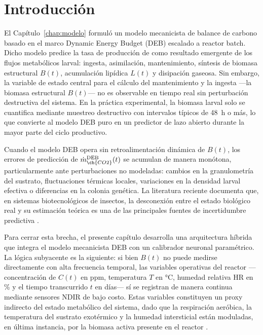 \section{Introducción}
\label{sec:cap4_introduccion}

El Capítulo~\ref{chap:modelo} formuló un modelo mecanicista de balance de carbono basado en el marco Dynamic Energy Budget (DEB) escalado a reactor batch. Dicho modelo predice la tasa de producción de  como resultado emergente de los flujos metabólicos larval: ingesta, asimilación, mantenimiento, síntesis de biomasa estructural $B(t)$, acumulación lipídica $L(t)$ y disipación gaseosa. Sin embargo, la variable de estado central para el cálculo del mantenimiento y la ingesta ---la biomasa estructural $B(t)$--- no es observable en tiempo real sin perturbación destructiva del sistema. En la práctica experimental, la biomasa larval solo se cuantifica mediante muestreo destructivo con intervalos típicos de 48~h o más, lo que convierte al modelo DEB puro en un predictor de lazo abierto durante la mayor parte del ciclo productivo.

Cuando el modelo DEB opera sin retroalimentación dinámica de $B(t)$, los errores de predicción de $\dot{m}_{\ch{CO2}}^{\mathrm{DEB}}(t)$ se acumulan de manera monótona, particularmente ante perturbaciones no modeladas: cambios en la granulometría del sustrato, fluctuaciones térmicas locales, variaciones en la densidad larval efectiva o diferencias en la colonia genética. La literatura reciente documenta que, en sistemas biotecnológicos de insectos, la desconexión entre el estado biológico real y su estimación teórica es una de las principales fuentes de incertidumbre predictiva \autocite{kobelskiProcessOptimizationBlack2024,padmanabhaModellingOptimalControl2023a}.

Para cerrar esta brecha, el presente capítulo desarrolla una arquitectura híbrida que integra el modelo mecanicista DEB con un calibrador neuronal paramétrico. La lógica subyacente es la siguiente: si bien $B(t)$ no puede medirse directamente con alta frecuencia temporal, las variables operativas del reactor ---concentración de  $C(t)$ en ppm, temperatura $T$ en \si{\celsius}, humedad relativa $\mathrm{HR}$ en \si{\percent} y el tiempo transcurrido $t$ en días--- sí se registran de manera continua mediante sensores NDIR de bajo costo. Estas variables constituyen un proxy indirecto del estado metabólico del sistema, dado que la respiración aeróbica, la temperatura del sustrato exotérmico y la humedad intersticial están moduladas, en última instancia, por la biomasa activa presente en el reactor \autocite{biagiDevelopmentMachineLearningbased2024a,rossiEstimatingDynamicsGreenhouse2024a}.

